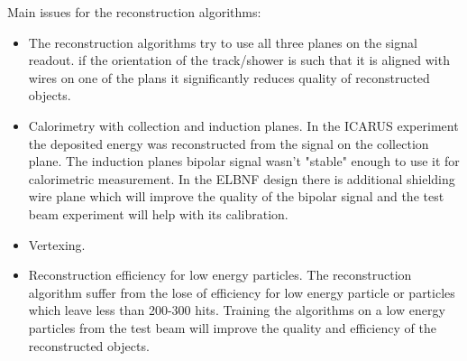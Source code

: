 Main issues for the reconstruction algorithms:
\begin{itemize}
\item The reconstruction algorithms try to use all three planes on the signal readout. if the orientation of the track/shower is such that it is aligned with wires on one of the plans it significantly reduces quality of reconstructed objects. 
\item Calorimetry with collection and induction planes. In the ICARUS experiment the deposited energy was reconstructed from the signal on the collection plane. The induction planes bipolar signal wasn't "stable" enough to use it for calorimetric measurement. In the ELBNF design there is additional shielding  wire plane which will improve the quality of the bipolar signal and the  test beam experiment will help with its calibration.
\item   Vertexing.
\item Reconstruction efficiency for low energy particles. The reconstruction algorithm suffer from the lose of efficiency for low energy particle or particles which leave less than 200-300 hits. Training the algorithms on a low energy particles from the test beam will improve the quality and efficiency of the reconstructed objects.
\end{itemize}
%


